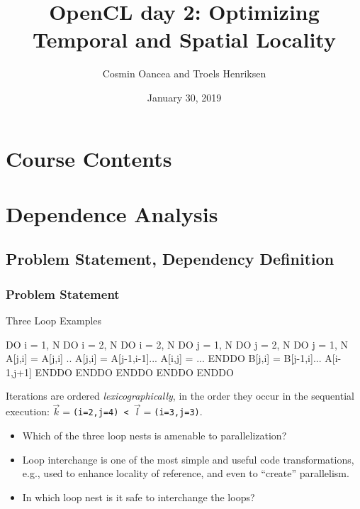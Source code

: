 \documentclass{beamer}
\title{OpenCL day 2: Optimizing Temporal and Spatial Locality}
\author{Cosmin Oancea and Troels Henriksen}
\date{January 30, 2019}
\newcommand{\emp}[1]{\textcolor{DikuRed}{ #1}}
\begin{document}
\frame{\titlepage}

\section{Course Contents}

\begin{frame}
  \tableofcontents
\end{frame}

\section{Dependence Analysis}

\subsection{Problem Statement, Dependency Definition}
\begin{frame}[fragile,t]
  \frametitle{Problem Statement}

\begin{block}{Three Loop Examples}
\begin{colorcode}
DO i = 1, N            DO i = 2, N               DO i = 2, N
 DO j = 1, N            DO j = 2, N               DO j = 1, N 
   A[j,i] = A[j,i] ..     A[j,i] = A[j-1,i-1]...   A[i,j] = ...
 ENDDO                    B[j,i] = B[j-1,i]...       A[i-1,j+1]
ENDDO                  ENDDO ENDDO               ENDDO ENDDO
\end{colorcode}
\end{block} 

Iterations are ordered {\em lexicographically}, in the order
they occur in the sequential execution: 
{\tt$\vec{k}=$(i=2,j=4) < $\vec{l}=$(i=3,j=3)}.

\bigskip

\begin{itemize}
    \item \emp{Which of the three loop nests is amenable to parallelization?}\smallskip
    \item Loop interchange is one of the most simple and useful code transformations,
            e.g., used to enhance locality of reference, and even to ``create'' 
            parallelism.\smallskip
    \item \emp{In which loop nest is it safe to interchange the loops?}
\end{itemize}

\end{frame}
\end{document}
